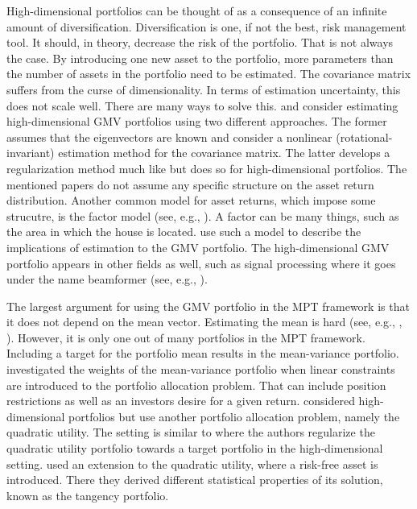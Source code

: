 High-dimensional portfolios can be thought of as a consequence of an infinite amount of diversification.
Diversification is one, if not the best, risk management tool.
It should, in theory, decrease the risk of the portfolio. 
That is not always the case.
By introducing one new asset to the portfolio, more parameters than the number of assets in the portfolio need to be estimated. 
The covariance matrix suffers from the curse of dimensionality. 
In terms of estimation uncertainty, this does not scale well.
There are many ways to solve this.
\citet{lw20} and \citet{bodnar2018estimation} consider estimating high-dimensional GMV portfolios using two different approaches.
The former assumes that the eigenvectors are known and consider a nonlinear (rotational-invariant) estimation method for the covariance matrix. 
The latter develops a regularization method much like \citet{frahm2010} but does so for high-dimensional portfolios.
The mentioned papers do not assume any specific structure on the asset return distribution. 
Another common model for asset returns, which impose some strucutre, is the factor model (see, e.g., \citet{ross2013arbitrage}). 
A factor can be many things, such as the area in which the house is located.
\citet{ding2020high} use such a model to describe the implications of estimation to the GMV portfolio.
The high-dimensional GMV portfolio appears in other fields as well, such as signal processing where it goes under the name beamformer (see, e.g., \citet{LiStoicaWang2004}). 

The largest argument for using the GMV portfolio in the MPT framework is that it does not depend on the mean vector.
Estimating the mean is hard (see, e.g., \citet{merton1980estimating}, \citet{best1991sensitivity}).
However, it is only one out of many portfolios in the MPT framework.
Including a target for the portfolio mean results in the mean-variance portfolio.
\citet{el2010high} investigated the weights of the mean-variance portfolio when linear constraints are introduced to the portfolio allocation problem.
That can include position restrictions as well as an investors desire for a given return.
\citet{bodnarokhrinparolya2020} considered high-dimensional portfolios but use another portfolio allocation problem, namely the quadratic utility.
The setting is similar to \citet{bodnar2018estimation} where the authors regularize the quadratic utility portfolio towards a target portfolio in the high-dimensional setting.
\citet{karlsson2021statistical} used an extension to the quadratic utility, where a risk-free asset is introduced.
There they derived different statistical properties of its solution, known as the tangency portfolio.

